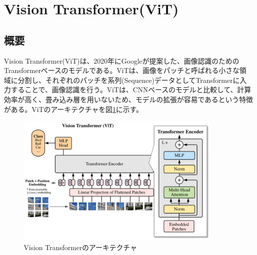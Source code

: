 \documentclass{ltjsarticle}
\begin{document}
\clearpage
\section{Vision Transformer(ViT)}
\subsection{概要}
Vision Transformer(ViT)は、2020年にGoogleが提案した、画像認識のためのTransformerベースのモデルである。ViTは、画像をパッチと呼ばれる小さな領域に分割し、それぞれのパッチを系列(Sequence)データとしてTransformerに入力することで、画像認識を行う。ViTは、CNNベースのモデルと比較して、計算効率が高く、畳み込み層を用いないため、モデルの拡張が容易であるという特徴がある。ViTのアーキテクチャを図\ref{fig:ViT}に示す。
\begin{figure}[htbp]
  \centering
  \includegraphics[width=10cm]{./capture/ViT.png}
  \caption{Vision Transformerのアーキテクチャ}
  \label{fig:ViT}
\end{figure}
\end{document}
